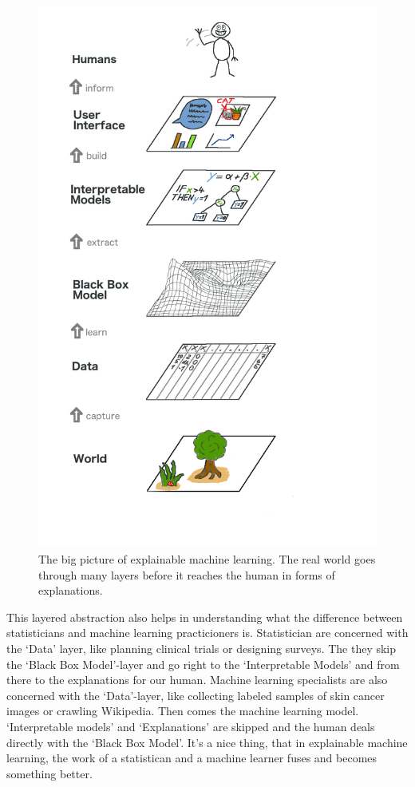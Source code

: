 \documentclass[12pt,]{krantz}
\theoremstyle{definition}
\theoremstyle{definition}
\theoremstyle{definition}
\theoremstyle{remark}
\begin{document}
\begin{figure}
\includegraphics[width=0.8\linewidth]{images/big-picture} \caption{The big picture of explainable machine learning. The real world goes through many layers before it reaches the human in forms of explanations.}\label{fig:bigpicture}
\end{figure}

This layered abstraction also helps in understanding what the difference
between statisticians and machine learning practicioners is.
Statistician are concerned with the `Data' layer, like planning clinical
trials or designing surveys. The they skip the `Black Box Model'-layer
and go right to the `Interpretable Models' and from there to the
explanations for our human. Machine learning specialists are also
concerned with the `Data'-layer, like collecting labeled samples of skin
cancer images or crawling Wikipedia. Then comes the machine learning
model. `Interpretable models' and `Explanations' are skipped and the
human deals directly with the `Black Box Model'. It's a nice thing, that
in explainable machine learning, the work of a statistican and a machine
learner fuses and becomes something better.
\end{document}
